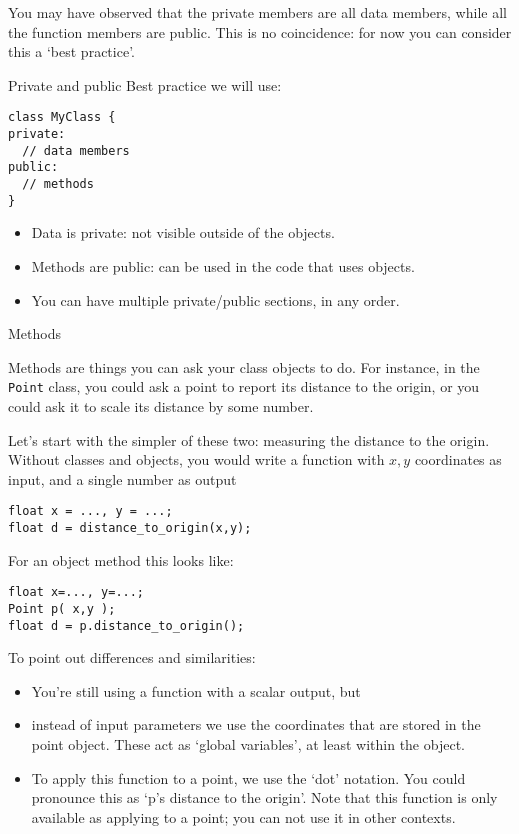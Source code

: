 You may have observed that the private members are all data members,
while all the function members are public.
This is no coincidence: for now you can consider this a `best practice'.

\begin{block}{Private and public}
  \label{sl:public-private-basic}
  Best practice we will use:
\begin{lstlisting}
class MyClass {
private:
  // data members
public:
  // methods
}
\end{lstlisting}
\begin{itemize}
\item Data is private: not visible outside of the objects.
\item Methods are public: can be used in the code that uses objects.
\item You can have multiple private/public sections, in any order.
\end{itemize}
\end{block}

 {Methods}

Methods are things you can ask your class objects to do. For instance,
in the \lstinline{Point} class, you could ask
a point to report its distance to the origin,
or you could ask it to scale its distance by some number.

Let's start with the simpler of these two: measuring the distance to the origin.
Without classes and objects, you would write a function with $x,y$ coordinates
as input,
and a single number as output
\begin{lstlisting}
float x = ..., y = ...;
float d = distance_to_origin(x,y);
\end{lstlisting}

For an object method this looks like:
\begin{lstlisting}
float x=..., y=...;
Point p( x,y );
float d = p.distance_to_origin();
\end{lstlisting}
To point out differences and similarities:
\begin{itemize}
\item
  You're still using a function with a scalar output, but
\item instead of input parameters we use the coordinates
  that are stored in the point object.
  These act as `global variables', at least within the object.
\item To apply this function to a point, we use the `dot' notation.
  You could pronounce this as `p's distance to the origin'.
  Note that this function is only available
  as applying to a point; you can not use it in other contexts.
\end{itemize}

